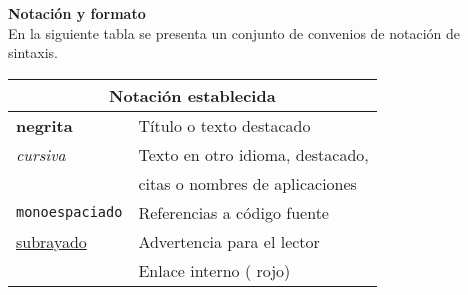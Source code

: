 \blankpage{}

\thispagestyle{prefacepage}
{\large \textbf{Notación y formato}} \smallskip 
\vspace{0.5cm}\\
En la siguiente tabla se presenta un conjunto de convenios de notación de sintaxis.\smallskip 
\vspace{0.5cm}
\begin{center}
    \begin{tabular}{|l|l|} \hline
        \multicolumn{2}{|c|}{Notación establecida} \\ \hline
        \textbf{negrita} & Título o texto destacado \\ \hline
        \textit{cursiva} & Texto en otro idioma, destacado, \\ & citas o nombres de aplicaciones \\ \hline
        \texttt{monoespaciado} & Referencias a código fuente \\ \hline
        \underline{subrayado} & Advertencia para el lector \\ \hline
        {\color{Red}{color}} &  Enlace interno ({\color{Red} rojo}) \\ \hline
    \end{tabular}
\end{center}


\blankpage{}



